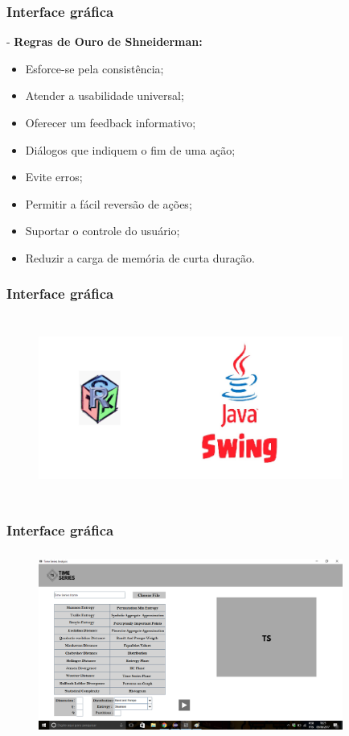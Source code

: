 \documentclass[10pt, compress]{beamer}
\begin{document}
\begin{frame}[fragile]
\frametitle{Interface gráfica}

-\textbf{ \Large Regras de Ouro de Shneiderman:}

\begin{itemize}
\item Esforce-se pela consistência;
\item Atender a usabilidade universal;
\item Oferecer um feedback informativo;
\item Diálogos que indiquem o fim de uma ação;
\item Evite erros;
\item Permitir a fácil reversão de ações;
\item Suportar o controle do usuário;
\item Reduzir a carga de memória de curta duração.
\end{itemize}
\end{frame}

\begin{frame}[fragile]
\frametitle{Interface gráfica}
\begin{figure}
  \centering
   \includegraphics[width=10cm,height=6cm]{FInterface.png}
\end{figure}
\end{frame}

\begin{frame}[fragile]
\frametitle{Interface gráfica}
\begin{figure}
  \centering
   \includegraphics[width=10cm,height=6cm]{tela4.png}
\end{figure}
\end{frame}
\end{document}

